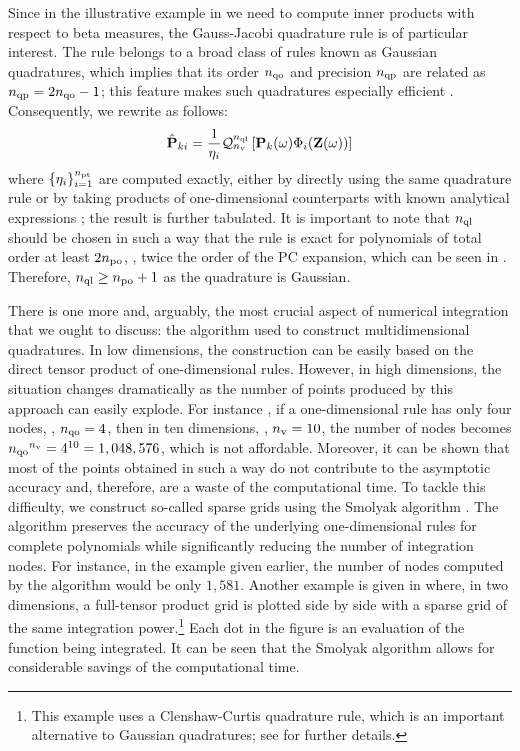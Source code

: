 Since in the illustrative example in  we need to compute inner products with respect to beta measures, the Gauss-Jacobi quadrature rule is of particular interest.
The rule belongs to a broad class of rules known as Gaussian quadratures, which implies that its order ${n_\text{qo}}$ and precision ${n_\text{qp}}$ are related as ${n_\text{qp}} = 2 {n_\text{qo}} - 1$; this feature makes such quadratures especially efficient \cite{heiss2008}.
Consequently, we rewrite  as follows:
\[
  \hat{\mathbf{P}}_{ki} = \frac{1}{\eta_i} \mathcal{Q}_{{n_\text{v}}}^{{n_\text{ql}}}\left[\mathbf{P}_k(\omega) \Phi_i(\mathbf{Z}(\omega))\right]
\]
where $\{ \eta_i \}_{i = 1}^{{n_\text{pt}}}$ are computed exactly, either by directly using the same quadrature rule or by taking products of one-dimensional counterparts with known analytical expressions \cite{xiu2010}; the result is further tabulated.
It is important to note that ${n_\text{ql}}$ should be chosen in such a way that the rule is exact for polynomials of total order at least $2 {n_\text{po}}$, \ie, twice the order of the PC expansion, which can be seen in  \cite{eldred2008}.
Therefore, ${n_\text{ql}} \geq {n_\text{po}} + 1$ as the quadrature is Gaussian.

There is one more and, arguably, the most crucial aspect of numerical integration that we ought to discuss: the algorithm used to construct multidimensional quadratures.
In low dimensions, the construction can be easily based on the direct tensor product of one-dimensional rules.
However, in high dimensions, the situation changes dramatically as the number of points produced by this approach can easily explode.
For instance \cite{heiss2008}, if a one-dimensional rule has only four nodes, \ie, ${n_\text{qo}} = 4$, then in ten dimensions, \ie, ${n_\text{v}} = 10$, the number of nodes becomes ${n_\text{qo}}^{n_\text{v}} = 4^{10} = 1,048,576$, which is not affordable.
Moreover, it can be shown that most of the points obtained in such a way do not contribute to the asymptotic accuracy and, therefore, are a waste of the computational time.
To tackle this difficulty, we construct so-called sparse grids using the Smolyak algorithm \cite{eldred2008, burkardt2013, heiss2008}.
The algorithm preserves the accuracy of the underlying one-dimensional rules for complete polynomials while significantly reducing the number of integration nodes.
For instance, in the example given earlier, the number of nodes computed by the algorithm would be only $1,581$.
Another example is given in  \cite{eldred2008} where, in two dimensions, a full-tensor product grid is plotted side by side with a sparse grid of the same integration power.\footnote{This example uses a Clenshaw-Curtis quadrature rule, which is an important alternative to Gaussian quadratures; see \cite{eldred2008} for further details.}
Each dot in the figure is an evaluation of the function being integrated.
It can be seen that the Smolyak algorithm allows for considerable savings of the computational time.
